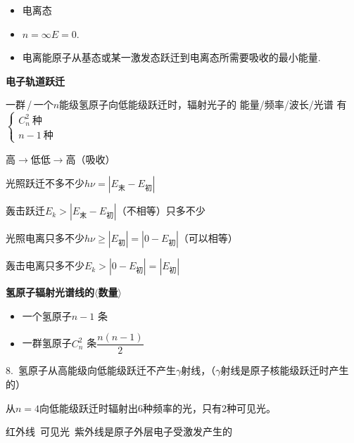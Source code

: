 \begin{itemize}
\item 电离态
\item $n=\infty$\quad $E=0$. %
\item 电离能\quad 原子从基态或某一激发态跃迁到电离态所需要吸收的最小能量.
\end{itemize}

\textbf{电子轨道跃迁}

一群\,/\,一个\quad $n$能级氢原子向低能级跃迁时，辐射光子的 能量/频率/波长/光谱 有\quad $\left\{\begin{array}{l}C_n^2\ \text{种}\\ n-1\ \text{种}\end{array}\right.$ %

高$\to$低\qquad 低$\to$高（吸收） %

光照跃迁\quad 不多不少\quad $h\nu=|E_{\text{末}}-E_{\text{初}}|$

轰击跃迁\quad $E_k>|E_{\text{末}}-E_{\text{初}}|$（不相等）\quad 只多不少

光照电离\quad 只多不少\quad $h\nu\ge|E_{\text{初}}|=|0-E_{\text{初}}|$（可以相等）

轰击电离\quad 只多不少\quad $E_k>|0-E_{\text{初}}|=|E_{\text{初}}|$

\textbf{氢原子辐射光谱线的$\langle$数量$\rangle$} %
\begin{itemize}
\item[] 一个氢原子\quad $n-1$ 条
\item[] 一群氢原子\quad $C_n^2$ 条\quad $\dfrac{n(n-1)}{2}$
\end{itemize}

8.\ 氢原子从高能级向低能级跃迁不产生$\gamma$射线，（$\gamma$射线是原子核能级跃迁时产生的）

\hspace{1.5em}从$n=4$向低能级跃迁时辐射出6种频率的光，只有2种可见光。

\hspace{1.5em}红外线\ 可见光\ 紫外线是原子外层电子受激发产生的

